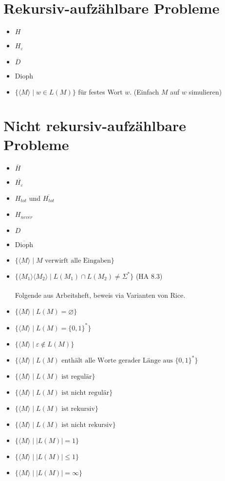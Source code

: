 \documentclass[a4paper,graphics,11pt]{article}
\newcommand{\eps}[0]{\varepsilon}
\newcommand{\godel}[1]{\langle #1 \rangle}
\begin{document}
\newpage

\section*{Rekursiv-aufzählbare Probleme}
\begin{itemize}
    \item $H$
    \item $H_\eps$
    \item $\overline{D}$
    \item Dioph
    \item $\{\godel{M}\mid w \in L(M)\}$ für festes Wort $w$.
        (Einfach $M$ auf $w$ simulieren)
\end{itemize}

\section*{Nicht rekursiv-aufzählbare Probleme}
\begin{itemize}
    \item $\overline{H}$
    \item $\overline{H_\eps}$
    \item $H_{tot}$ und $\overline{H_{tot}}$
    \item $H_{never}$
    \item $D$
    \item $\overline{\text{Dioph}}$
    \item $\{\godel{M} \mid M \text{ verwirft alle Eingaben}\}$
    \item $\{\godel{M_1}\godel{M_2} \mid L(M_1) \cap L(M_2) \neq \Sigma^*\}$ (HA 8.3)\\
    \\ Folgende aus Arbeitsheft, beweis via Varianten von Rice.
    \item $\{\godel{M} \mid L(M) = \varnothing\}$
    \item $\{\godel{M} \mid L(M) = \{0,1\}^*\}$
    \item $\{\godel{M} \mid \eps \notin L(M)\}$
    \item $\{\godel{M} \mid L(M) \text{ enthält alle Worte gerader Länge aus }\{0,1\}^* \}$
    \item $\{\godel{M} \mid L(M) \text{ ist regulär}\}$
    \item $\{\godel{M} \mid L(M) \text{ ist nicht regulär}\}$
    \item $\{\godel{M} \mid L(M) \text{ ist rekursiv}\}$
    \item $\{\godel{M} \mid L(M) \text{ ist nicht rekursiv}\}$
    \item $\{\godel{M} \mid |L(M)| = 1\}$
    \item $\{\godel{M} \mid |L(M)| \leq 1\}$
    \item $\{\godel{M} \mid |L(M)| = \infty\}$
\end{itemize}
\end{document}
